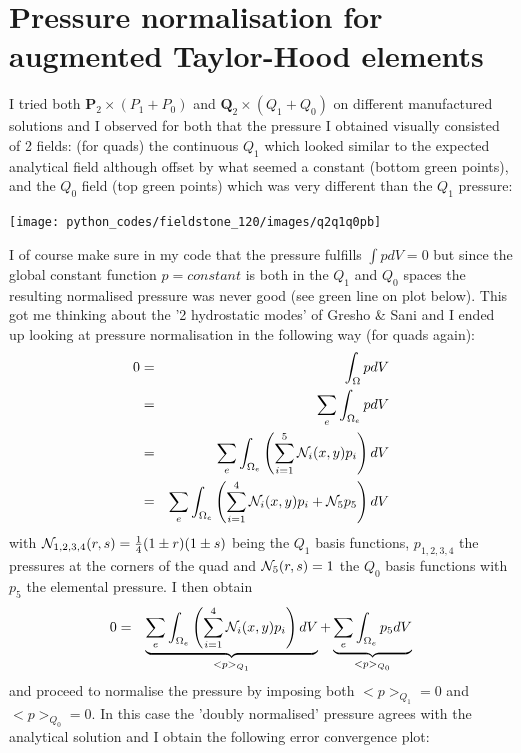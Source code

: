 \newpage
\section*{Pressure normalisation for augmented Taylor-Hood elements}


I tried both ${\bm P}_2\times (P_1+P_0)$ and ${\bm Q}_2\times (Q_1+Q_0)$ on different manufactured solutions 
and I observed for both that the pressure I obtained visually consisted of 2 fields: (for quads) 
the continuous $Q_1$ which looked similar to the expected analytical field although offset by what 
seemed a constant (bottom green points), and the $Q_0$ field (top green points) which was 
very different than the $Q_1$ pressure:

\begin{center}
\texttt{[image: python\_codes/fieldstone\_120/images/q2q1q0pb]}
\end{center}

I of course make sure in my code that the pressure fulfills $\int p dV=0$ but since 
the global constant function $p=constant$ is both in the $Q_1$ and $Q_0$ spaces the 
resulting normalised pressure was never good (see green line on plot below). 
This got me thinking about the '2 hydrostatic modes' of Gresho \& Sani and
I ended up looking at pressure normalisation in the following way (for quads again):
\begin{eqnarray}
0 
&=& \int_\Omega p dV \nonumber\\
&=& \sum_e \int_{\Omega_e} p dV \nonumber\\
&=& \sum_e \int_{\Omega_e} \left( \sum_{i=1}^5 {\mathcal{N}}_i(x,y) p_i \right) dV \nonumber\\
&=& \sum_e \int_{\Omega_e} \left( \sum_{i=1}^4 {\mathcal{N}}_i(x,y) p_i + {\mathcal{N}}_5 p_5 \right) dV
\end{eqnarray}
with ${\mathcal{N}}_{1,2,3,4}(r,s)=\frac14(1\pm r)(1\pm s)$ being
the $Q_1$ basis functions, $p_{1,2,3,4}$ the pressures at the corners
of the quad and ${\mathcal{N}}_5(r,s)=1$ the $Q_0$ basis functions with $p_5$ the elemental pressure.
I then obtain 
\begin{eqnarray}
0 
&=& \underbrace{\sum_e \int_{\Omega_e} \left( \sum_{i=1}^4 {\mathcal{N}}_i(x,y) p_i \right) dV}_{<p>_{Q_1}}
+ \underbrace{\sum_e \int_{\Omega_e} p_5  dV}_{<p>_{Q_0}}
\end{eqnarray}
and proceed to normalise the pressure by imposing both $<p>_{Q_1}=0$ and $<p>_{Q_0}=0$.
In this case the 'doubly normalised' pressure agrees with the analytical solution 
and I obtain the following error convergence plot:

